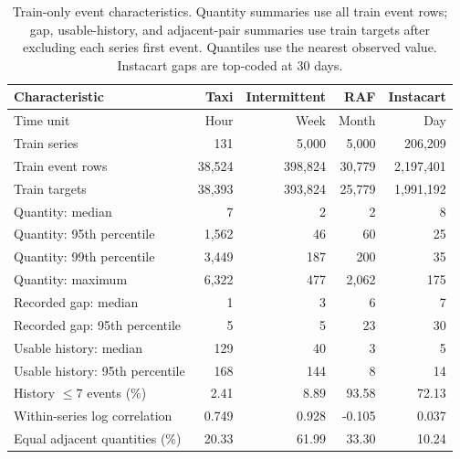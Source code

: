 \documentclass[runningheads]{llncs}
\begin{document}
\begin{table}[t]
\caption{Train-only event characteristics. Quantity summaries use all train event rows; gap, usable-history, and adjacent-pair summaries use train targets after excluding each series\textquotesingle{} first event. Quantiles use the nearest observed value. Instacart gaps are top-coded at 30 days.}
\label{tab:train-characteristics}\centering\scriptsize
\setlength{\tabcolsep}{4pt}
\begin{tabular}{lrrrr}
\toprule
Characteristic & Taxi & Intermittent & RAF & Instacart\\
\midrule
Time unit & Hour & Week & Month & Day\\
Train series & 131 & 5,000 & 5,000 & 206,209\\
Train event rows & 38,524 & 398,824 & 30,779 & 2,197,401\\
Train targets & 38,393 & 393,824 & 25,779 & 1,991,192\\
Quantity: median & 7 & 2 & 2 & 8\\
Quantity: 95th percentile & 1,562 & 46 & 60 & 25\\
Quantity: 99th percentile & 3,449 & 187 & 200 & 35\\
Quantity: maximum & 6,322 & 477 & 2,062 & 175\\
Recorded gap: median & 1 & 3 & 6 & 7\\
Recorded gap: 95th percentile & 5 & 5 & 23 & 30\\
Usable history: median & 129 & 40 & 3 & 5\\
Usable history: 95th percentile & 168 & 144 & 8 & 14\\
History $\le7$ events (\%) & 2.41 & 8.89 & 93.58 & 72.13\\
Within-series log correlation & 0.749 & 0.928 & -0.105 & 0.037\\
Equal adjacent quantities (\%) & 20.33 & 61.99 & 33.30 & 10.24\\
\bottomrule
\end{tabular}
\end{table}
\end{document}
